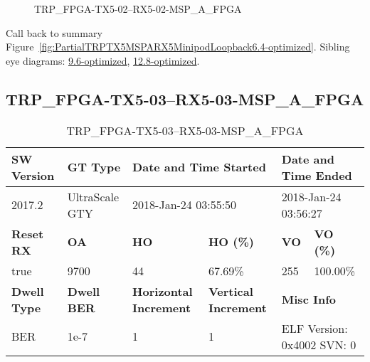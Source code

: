 \begin{figure}[h]
\caption{TRP\_FPGA-TX5-02--RX5-02-MSP\_A\_FPGA} \label{fig:TRPFPGATX502RX502MSPAFPGA6.4-optimized}
\end{figure}

Call back to summary Figure~\ref{fig:PartialTRPTX5MSPARX5MinipodLoopback6.4-optimized}.
Sibling eye diagrams: \hyperref[sec:TRPFPGATX502RX502MSPAFPGA9.6-optimized]{9.6-optimized}, \hyperref[sec:TRPFPGATX502RX502MSPAFPGA12.8-optimized]{12.8-optimized}.

\clearpage
\newpage


\subsection{TRP\_FPGA-TX5-03--RX5-03-MSP\_A\_FPGA}\label{sec:TRPFPGATX503RX503MSPAFPGA6.4-optimized}

\begin{table}[h]
\centering
\caption{TRP\_FPGA-TX5-03--RX5-03-MSP\_A\_FPGA}
\label{tab:TRPFPGATX503RX503MSPAFPGA6.4-optimized}
\begin{tabular}{@{}|l|l|l|l|l|l|@{}}
\toprule
\textbf{SW Version}                & \textbf{GT Type}   & \multicolumn{2}{l|}{\textbf{Date and Time Started}}            & \multicolumn{2}{l|}{\textbf{Date and Time Ended}}        \\ \midrule
2017.2                       & UltraScale GTY          & \multicolumn{2}{l|}{2018-Jan-24 03:55:50}                   & \multicolumn{2}{l|}{2018-Jan-24 03:56:27}               \\ \midrule
\textbf{Reset RX}                  & \textbf{OA} & \textbf{HO}   & \textbf{HO (\%)} & \textbf{VO} & \textbf{VO (\%)} \\ \midrule
true & 9700        & 44          & 67.69\%        & 255        & 100.00\%       \\ \midrule
\textbf{Dwell Type}                & \textbf{Dwell BER} & \textbf{Horizontal Increment} & \textbf{Vertical Increment}    & \multicolumn{2}{l|}{\textbf{Misc Info}}                  \\ \midrule
BER                            & 1e-7        & 1        & 1           & \multicolumn{2}{l|}{ELF Version: 0x4002 SVN: 0}                         \\ \bottomrule
\end{tabular}
\end{table}

